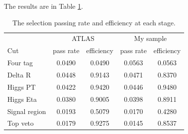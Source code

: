\documentclass[12pt]{article}
\begin{document}
			The results are in Table \ref{tab:signal_selection_efficiency_MV2c10}.
			\begin{table}[htpb]
				\centering
				\caption{The selection passing rate and efficiency at each stage.}
				\label{tab:signal_selection_efficiency_MV2c10}

				\begin{tabular}{l|cc|cc}
								  & \multicolumn{2}{|c|}{ATLAS} & \multicolumn{2}{|c}{My sample} \\
					Cut           & pass rate       & efficiency       & pass rate         & efficiency         \\ \hline
					Four tag      & 0.0490 & 0.0490 & 0.0563 & 0.0563 \\
					Delta R       & 0.0448 & 0.9143 & 0.0471 & 0.8370 \\
					Higgs PT      & 0.0422 & 0.9420 & 0.0446 & 0.9480 \\
					Higgs Eta     & 0.0380 & 0.9005 & 0.0398 & 0.8911 \\
					Signal region & 0.0193 & 0.5079 & 0.0170 & 0.4280 \\
					Top veto      & 0.0179 & 0.9275 & 0.0145 & 0.8537
				\end{tabular}
			\end{table}
			

\end{document}

